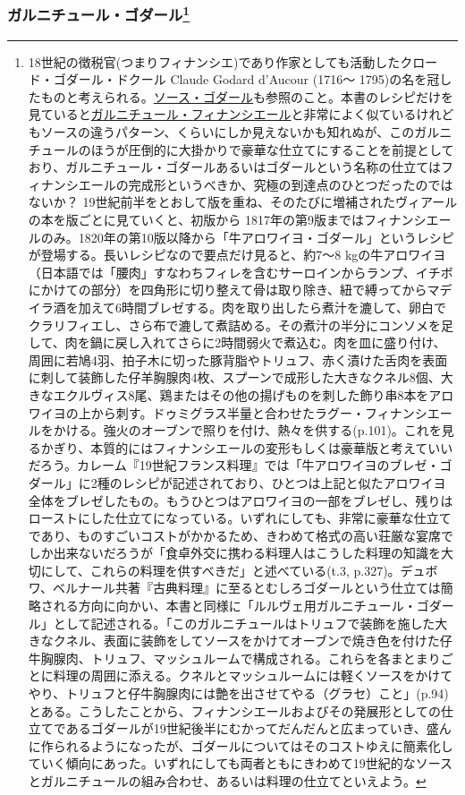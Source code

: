 \begin{recette}
{\subsubsection[ガルニチュール・ゴダール]{\texorpdfstring{ガルニチュール・ゴダール\footnote{18世紀の徴税官(つまりフィナンシエ)であり作家としても活動したクロード・ゴダール・ドクール
  Claude Godard d'Aucour (1716〜
  1795)の名を冠したものと考えられる。\protect\hyperlink{sauce-godard}{ソース・ゴダール}も参照のこと。本書のレシピだけを見ていると\protect\hyperlink{garniture-a-la-financiere}{ガルニチュール・フィナンシエール}と非常によく似ているけれどもソースの違うパターン、くらいにしか見えないかも知れぬが、このガルニチュールのほうが圧倒的に大掛かりで豪華な仕立てにすることを前提としており、ガルニチュール・ゴダールあるいはゴダールという名称の仕立てはフィナンシエールの完成形というべきか、究極の到達点のひとつだったのではないか？
  19世紀前半をとおして版を重ね、そのたびに増補されたヴィアールの本を版ごとに見ていくと、初版から
  1817年の第9版まではフィナンシエールのみ。1820年の第10版以降から「牛アロワイヨ・ゴダール」というレシピが登場する。長いレシピなので要点だけ見ると、約7〜8
  kgの牛アロワイヨ（日本語では「腰肉」すなわちフィレを含むサーロインからランプ、イチボにかけての部分）を四角形に切り整えて骨は取り除き、紐で縛ってからマデイラ酒を加えて6時間ブレゼする。肉を取り出したら煮汁を漉して、卵白でクラリフィエし、さら布で漉して煮詰める。その煮汁の半分にコンソメを足して、肉を鍋に戻し入れてさらに2時間弱火で煮込む。肉を皿に盛り付け、周囲に若鳩4羽、拍子木に切った豚背脂やトリュフ、赤く漬けた舌肉を表面に刺して装飾した仔羊胸腺肉4枚、スプーンで成形した大きなクネル8個、大きなエクルヴィス8尾、鶏またはその他の揚げものを刺した飾り串8本をアロワイヨの上から刺す。ドゥミグラス半量と合わせたラグー・フィナンシエールをかける。強火のオーブンで照りを付け、熱々を供する(p.101)。これを見るかぎり、本質的にはフィナンシエールの変形もしくは豪華版と考えていいだろう。カレーム『19世紀フランス料理』では「牛アロワイヨのブレゼ・ゴダール」に2種のレシピが記述されており、ひとつは上記と似たアロワイヨ全体をブレゼしたもの。もうひとつはアロワイヨの一部をブレゼし、残りはローストにした仕立てになっている。いずれにしても、非常に豪華な仕立てであり、ものすごいコストがかかるため、きわめて格式の高い荘厳な宴席でしか出来ないだろうが「食卓外交に携わる料理人はこうした料理の知識を大切にして、これらの料理を供すべきだ」と述べている(t.3,
  p.327)。デュボワ、ベルナール共著『古典料理』に至るとむしろゴダールという仕立ては簡略される方向に向かい、本書と同様に「ルルヴェ用ガルニチュール・ゴダール」として記述される。「このガルニチュールはトリュフで装飾を施した大きなクネル、表面に装飾をしてソースをかけてオーブンで焼き色を付けた仔牛胸腺肉、トリュフ、マッシュルームで構成される。これらを各まとまりごとに料理の周囲に添える。クネルとマッシュルームには軽くソースをかけてやり、トリュフと仔牛胸腺肉には艶を出させてやる（グラセ）こと」(p.94)とある。こうしたことから、フィナンシエールおよびその発展形としての仕立てであるゴダールが19世紀後半にむかってだんだんと広まっていき、盛んに作られるようになったが、ゴダールについてはそのコストゆえに簡素化していく傾向にあった。いずれにしても両者ともにきわめて19世紀的なソースとガルニチュールの組み合わせ、あるいは料理の仕立てといえよう。}}{ガルニチュール・ゴダール}}\label{garniture-godard}}


\end{recette}
